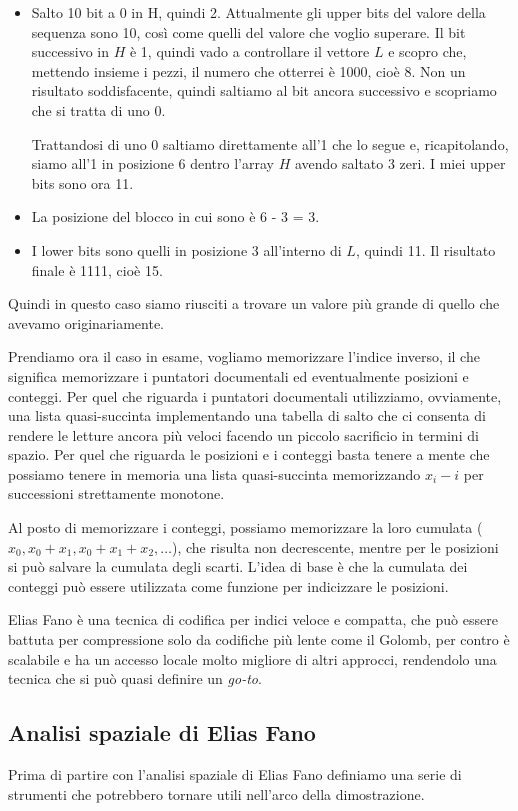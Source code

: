 \begin{itemize}
    \item Salto 10 bit a 0 in H, quindi 2. Attualmente gli upper bits del valore della sequenza sono 10, così come quelli del valore che voglio superare. Il bit successivo in $H$ è 1, quindi vado a controllare il vettore $L$ e scopro che, mettendo insieme i pezzi, il numero che otterrei è 1000, cioè 8. Non un risultato soddisfacente, quindi saltiamo al bit ancora successivo e scopriamo che si tratta di uno 0.

    Trattandosi di uno 0 saltiamo direttamente all'1 che lo segue e, ricapitolando, siamo all'1 in posizione 6 dentro l'array $H$ avendo saltato 3 zeri. I miei upper bits sono ora 11.
    \item La posizione del blocco in cui sono è 6 - 3 = 3.
    \item I lower bits sono quelli in posizione 3 all'interno di $L$, quindi 11. Il risultato finale è 1111, cioè 15.
\end{itemize}
Quindi in questo caso siamo riusciti a trovare un valore più grande di quello che avevamo originariamente.

Prendiamo ora il caso in esame, vogliamo memorizzare l'indice inverso, il che significa memorizzare i puntatori documentali ed eventualmente posizioni e conteggi. Per quel che riguarda i puntatori documentali utilizziamo, ovviamente, una lista quasi-succinta implementando una tabella di salto che ci consenta di rendere le letture ancora più veloci facendo un piccolo sacrificio in termini di spazio. Per quel che riguarda le posizioni e i conteggi basta tenere a mente che possiamo tenere in memoria una lista quasi-succinta memorizzando $x_i - i$  per successioni strettamente monotone.

Al posto di memorizzare i conteggi, possiamo memorizzare la loro cumulata ($x_0, x_0 + x_1, x_0 + x_1 + x_2, \dots$), che risulta non decrescente, mentre per le posizioni si può salvare la cumulata degli scarti. L'idea di base è che la cumulata dei conteggi può essere utilizzata come funzione per indicizzare le posizioni.

Elias Fano è una tecnica di codifica per indici veloce e compatta, che può essere battuta per compressione solo da codifiche più lente come il Golomb, per contro è scalabile e ha un accesso locale molto migliore di altri approcci, rendendolo una tecnica che si può quasi definire un \textit{go-to}.
\subsection{Analisi spaziale di Elias Fano}
Prima di partire con l'analisi spaziale di Elias Fano definiamo una serie di strumenti che potrebbero tornare utili nell'arco della dimostrazione.

